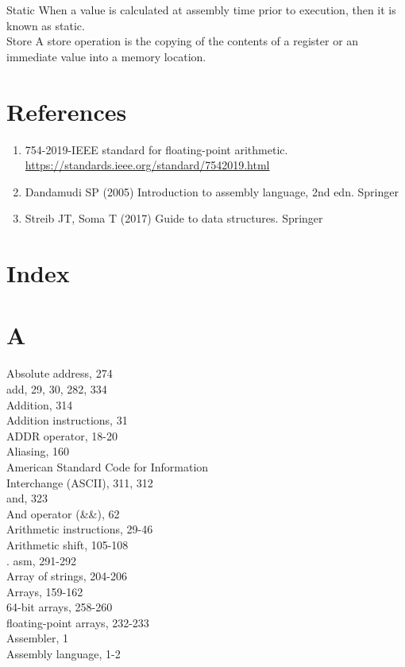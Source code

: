\documentclass[10pt]{article}
\begin{document}
Static When a value is calculated at assembly time prior to execution, then it is known as static.\\
Store A store operation is the copying of the contents of a register or an immediate value into a memory location.

\section*{References}
\begin{enumerate}
  \item 754-2019-IEEE standard for floating-point arithmetic. \href{https://standards.ieee.org/standard/7542019.html}{https://standards.ieee.org/standard/7542019.html}
  \item Dandamudi SP (2005) Introduction to assembly language, 2nd edn. Springer
  \item Streib JT, Soma T (2017) Guide to data structures. Springer
\end{enumerate}

\section*{Index}
\section*{A}
Absolute address, 274\\
add, 29, 30, 282, 334\\
Addition, 314\\
Addition instructions, 31\\
ADDR operator, 18-20\\
Aliasing, 160\\
American Standard Code for Information\\
Interchange (ASCII), 311, 312\\
and, 323\\
And operator (\&\&), 62\\
Arithmetic instructions, 29-46\\
Arithmetic shift, 105-108\\
. asm, 291-292\\
Array of strings, 204-206\\
Arrays, 159-162\\
64-bit arrays, 258-260\\
floating-point arrays, 232-233\\
Assembler, 1\\
Assembly language, 1-2
\end{document}
